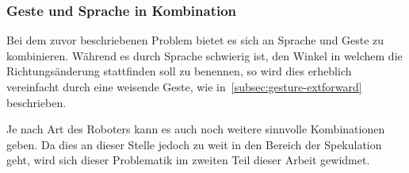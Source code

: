 \subsubsection{Geste und Sprache in Kombination}

Bei dem zuvor beschriebenen Problem bietet es sich an Sprache und Geste zu kombinieren. W\"ahrend es durch Sprache schwierig ist, den Winkel in 
welchem die Richtungs\"anderung stattfinden soll zu benennen, so wird dies erheblich vereinfacht durch eine weisende Geste, wie in~\ref{subsec:gesture-extforward} beschrieben.

Je nach Art des Roboters kann es auch noch weitere sinnvolle Kombinationen geben. Da dies an dieser Stelle jedoch zu weit in den Bereich der Spekulation geht,
wird sich dieser Problematik im zweiten Teil dieser Arbeit gewidmet.
